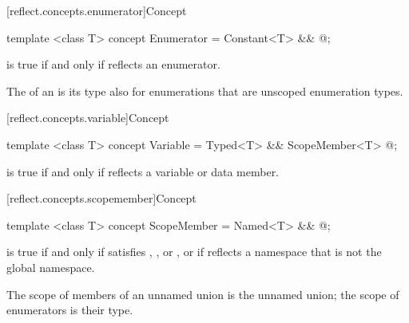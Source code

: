 [reflect.concepts.enumerator]{Concept }

\begin{std.txt}\color{addclr}

\begin{itemdecl}
template <class T> concept Enumerator = Constant<T> && @\seebelow@;
\end{itemdecl}

\begin{itemdescr}
\pnum
{} is true if and only if  reflects an enumerator. \begin{note} The  of an  is its type also for enumerations that are unscoped enumeration types. \end{note}

\end{itemdescr}
\end{std.txt}

[reflect.concepts.variable]{Concept }

\begin{std.txt}\color{addclr}

\begin{itemdecl}
template <class T> concept Variable = Typed<T> && ScopeMember<T> @\seebelow@;
\end{itemdecl}

\begin{itemdescr}
\pnum
{} is true if and only if  reflects a variable or data member.

\end{itemdescr}
\end{std.txt}

[reflect.concepts.scopemember]{Concept }

\begin{std.txt}\color{addclr}

\begin{itemdecl}
template <class T> concept ScopeMember = Named<T> && @\seebelow@;
\end{itemdecl}

\begin{itemdescr}
\pnum
{} is true if and only if  satisfies , , or , or if  reflects a namespace that is not the global namespace. \begin{note} The scope of members of an unnamed union is the unnamed union; the scope of enumerators is their type. \end{note}

\end{itemdescr}
\end{std.txt}

